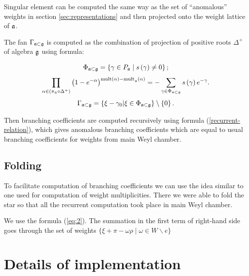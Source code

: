 \documentclass[a4paper,12pt]{article}
\theoremstyle{definition} \newtheorem{Def}{Definition}
\begin{document}
Singular element can be computed the same way as the set of ``anomalous''
weights in section \ref{sec:representations} and then projected onto
the weight lattice of $\frak{a}$. 

The fan $\Gamma_{\frak{a}\subset \frak{g}}$ is computed as the
combination of projection of positive roots $\Delta^{+}$ of algebra
$\frak{g}$ using formula:

\begin{equation}
  \label{phi-d}
  \Phi _{\frak{a}\subset \frak{g}}=\left\{ \gamma \in P_{\frak{a}}\mid s\left(
      \gamma \right) \neq 0\right\} ;  
\end{equation}
\begin{equation}
  \label{fan-d}
  \prod_{\alpha \in \left( \pi _{\frak{a}}\circ \Delta ^{+}\right) }\left(
    1-e^{-\alpha }\right) ^{\mathrm{{mult}\left( \alpha \right) -{mult}}_{\frak{a%
      }}\mathrm{\left( \alpha \right) }}=-\sum_{\gamma \in \Phi _{\frak{a}\subset 
      \frak{g}}}s\left( \gamma \right) e^{-\gamma }.  
\end{equation}
\begin{equation}
  \label{fan-defined}
  \Gamma _{\frak{a}\subset \frak{g}}=\left\{ \xi -\gamma _{0}|\xi \in \Phi _{%
      \frak{a}\subset \frak{g}}\right\} \setminus \left\{ 0\right\} .
\end{equation}

Then branching coefficients are computed recursively using formula
(\ref{recurrent-relation}), which gives anomalous branching
coefficients which are equal to usual branching coefficients for
weights from main Weyl chamber. 

\subsection{Folding}
\label{sec:folding}

To facilitate computation of branching coefficients we can use the
idea similar to one used for computation of weight multiplicities.
There we were able to fold the star so that all the recurrent
computation took place in main Weyl chamber. 

We use the formula (\ref{eq:2}). The summation in the first term of
right-hand side goes through the set of weights $\{\xi+\pi-\omega
\rho\;|\;\omega\in W\backslash e\}$


\section{Details of implementation}
\label{sec:details-implementation}
\end{document}
